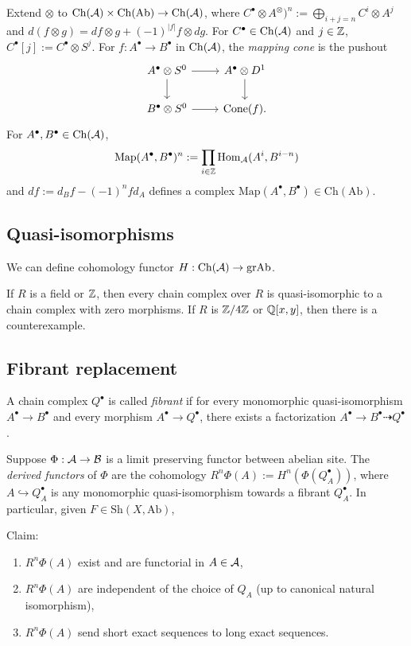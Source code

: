 \documentclass{../../../small}
\begin{document}
Extend $\otimes$ to $\mathrm{Ch}(\mathcal{A})\times\mathrm{Ch}(\mathrm{Ab})\to\mathrm{Ch}(\mathcal{A})$, where $C^\bullet\otimes A^\otimes)^n:=\bigoplus_{i+j=n}C^i\otimes A^j$ and $d(f\otimes g)=df\otimes g+(-1)^{|f|}f\otimes dg$.
For $C^\bullet\in\mathrm{Ch}(\mathcal{A})$ and $j\in\mathbb{Z}$, $C^\bullet[j]:=C^\bullet\otimes S^j$.
For $f:A^\bullet\to B^\bullet$ in $\mathrm{Ch}(\mathcal{A})$, the \emph{mapping cone} is the pushout
\[\begin{tikzcd}
A^\bullet\otimes S^0 \rar\dar & A^\bullet\otimes D^1 \dar\\
B^\bullet\otimes S^0 \rar & \mathrm{Cone}(f).
\end{tikzcd}\]
For $A^\bullet,B^\bullet\in\mathrm{Ch}(\mathcal{A})$,
\[\mathrm{Map}(A^\bullet,B^\bullet)^n:=\prod_{i\in\mathbb{Z}}\mathrm{Hom}_{\mathcal{A}}(A^i,B^{i-n})\]
and $df:=d_Bf-(-1)^nfd_A$ defines a complex $\mathrm{Map}(A^\bullet,B^\bullet)\in\mathrm{Ch}(\mathrm{Ab})$.


\subsection{Quasi-isomorphisms}
We can define cohomology functor $H:\mathrm{Ch}(\mathcal{A})\to\mathrm{grAb}$.

If $R$ is a field or $\mathbb{Z}$, then every chain complex over $R$ is quasi-isomorphic to a chain complex with zero morphisms.
If $R$ is $\mathbb{Z}/4\mathbb{Z}$ or $\mathbb{Q}[x,y]$, then there is a counterexample.


\subsection{Fibrant replacement}
A chain complex $Q^\bullet$ is called \emph{fibrant} if for every monomorphic quasi-isomorphism $A^\bullet\to B^\bullet$ and every morphism $A^\bullet\to Q^\bullet$, there exists a factorization $A^\bullet\to B^\bullet\dashrightarrow Q^\bullet$.

Suppose $\Phi:\mathcal{A}\to\mathcal{B}$ is a limit preserving functor between abelian site.
The \emph{derived functors} of $\Phi$ are the cohomology $R^n\Phi(A):=H^n(\Phi(Q_A^\bullet))$, where $A\hookrightarrow Q_A^\bullet$ is any monomorphic quasi-isomorphism towards a fibrant $Q_A^\bullet$.
In particular, given $F\in\mathrm{Sh}(X,\mathrm{Ab})$,

Claim:
\begin{enumerate}
\item $R^n\Phi(A)$ exist and are functorial in $A\in\mathcal{A}$,
\item $R^n\Phi(A)$ are independent of the choice of $Q_A$ (up to canonical natural isomorphism),
\item $R^n\Phi(A)$ send short exact sequences to long exact sequences.
\end{enumerate}
\end{document}
